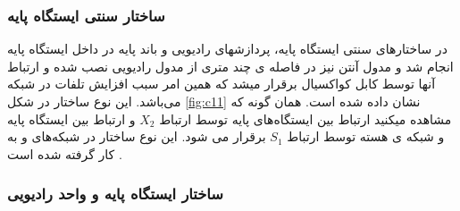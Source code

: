 \subsubsection{ساختار سنتی ایستگاه پایه }

در ساختارهای سنتی ایستگاه پایه، پردازشهای رادیویی و باند پایه در
داخل ایستگاه پایه انجام ‌شد و مدول آنتن نیز در فاصله
ی چند متری از مدول رادیویی نصب شده و ارتباط آنها
توسط کابل کواکسیال برقرار میشد که همین امر سبب
افزایش تلفات در شبکه می‌باشد. این نوع ساختار در شکل
\ref{fig:c11} نشان داده شده است. همان گونه که مشاهده میکنید
ارتباط بین ایستگاه‌های پایه توسط ارتباط  $X_2$ و ارتباط بین
ایستگاه پایه و شبکه ی هسته توسط ارتباط $ S_1$ برقرار می
شود. این نوع ساختار در شبکه‌های  و  به کار گرفته
شده است 
\cite{checko2015cloud}.

\subsubsection{ ساختار ایستگاه پایه و واحد رادیویی}

